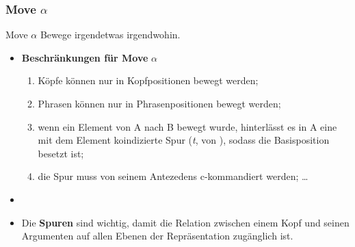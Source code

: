 \begin{frame}
\frametitle{Move $\alpha$}

\begin{block}{Move $\alpha$}
Bewege irgendetwas irgendwohin.
\end{block}

\begin{itemize}
	\item \textbf{Beschränkungen für Move} $\alpha$
	\begin{enumerate}
		\item Köpfe können nur in Kopfpositionen bewegt werden;
		\item Phrasen können nur in Phrasenpositionen bewegt werden;
		\item wenn ein Element von A nach B bewegt wurde, hinterlässt es in A eine mit dem Element koindizierte Spur (\emph{t}, von ), sodass die Basisposition besetzt ist;
		\item die Spur muss von seinem Antezedens c-kommandiert werden; \dots
	\end{enumerate}
	\item[]
	\item Die \textbf{Spuren} sind wichtig, damit die Relation zwischen einem Kopf und seinen Argumenten auf allen Ebenen der Repräsentation zugänglich ist.

\end{itemize}

\end{frame}


